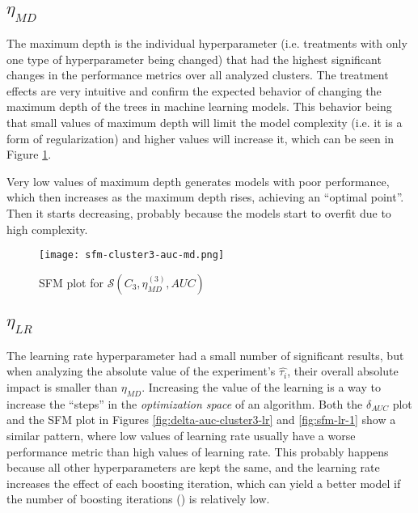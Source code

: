 \subsection{\texorpdfstring{\Large$\eta_{MD}$}{}}
\label{subsec:analysis-md}

The maximum depth is the individual hyperparameter (i.e. treatments with only one type of hyperparameter being changed) that had the highest significant changes in the performance metrics over all analyzed clusters. The treatment effects are very intuitive and confirm the expected behavior of changing the maximum depth of the trees in machine learning models. This behavior being that small values of maximum depth will limit the model complexity (i.e. it is a form of regularization) and higher values will increase it, which can be seen in Figure \ref{fig:sfm-md-1}.

Very low values of maximum depth generates models with poor performance, which then increases as the maximum depth rises, achieving an ``optimal point''. Then it starts decreasing, probably because the models start to overfit due to high complexity.

\begin{figure}[H]
    \centering
    \texttt{[image: sfm-cluster3-auc-md.png]}
    \caption{SFM plot for $\mathcal{S}(C_3, \eta^{(3)}_{MD}, AUC)$}
    \label{fig:sfm-md-1}
\end{figure}


\subsection{\texorpdfstring{\Large$\eta_{LR}$}{}}

The learning rate hyperparameter had a small number of significant results, but when analyzing the absolute value of the experiment's $\hat{\tau_i}$, their overall absolute impact is smaller than $\eta_{MD}$. Increasing the value of the learning is a way to increase the ``steps'' in the \textit{optimization space} of an algorithm. Both the $\delta_{AUC}$ plot and the SFM plot in Figures \ref{fig:delta-auc-cluster3-lr} and \ref{fig:sfm-lr-1} show a similar pattern, where low values of learning rate usually have a worse performance metric than high values of learning rate. This probably happens because all other hyperparameters are kept the same, and the learning rate increases the effect of each boosting iteration, which can yield a better model if the number of boosting iterations () is relatively low.

